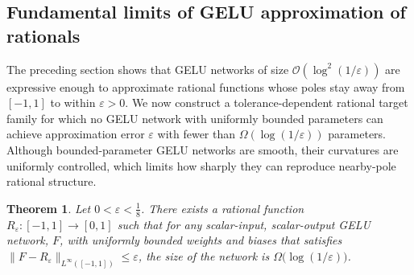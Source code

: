 \documentclass{article}
\theoremstyle{plain}
\newtheorem{theorem}{Theorem}[section]
\theoremstyle{definition}
\theoremstyle{remark}
\begin{document}
\subsection{Fundamental limits of GELU approximation of rationals}
 {The preceding section shows that GELU networks of size $\mathcal{O}(\log^2(1/\varepsilon))$ are expressive enough to approximate rational functions whose poles stay away from $[-1,1]$ to within $\varepsilon>0$. We now construct a tolerance-dependent rational target family for which no GELU network with uniformly bounded parameters can achieve approximation error $\varepsilon$ with fewer than $\Omega(\log(1/\varepsilon))$ parameters. Although bounded-parameter GELU networks are smooth, their curvatures are uniformly controlled, which limits how sharply they can reproduce nearby-pole rational structure.}

\begin{theorem}
 {Let $0<\varepsilon<\tfrac{1}{8}$. There exists a rational function $R_\varepsilon:[-1,1]\to[0,1]$ such that for any scalar-input, scalar-output GELU network, $F$, with uniformly bounded weights and biases that satisfies $\|F-R_\varepsilon\|_{L^\infty([-1,1])}\le \varepsilon$, the size of the network is $\Omega\bigl(\log(1/\varepsilon)\bigr)$.}
\end{theorem}
\end{document}
